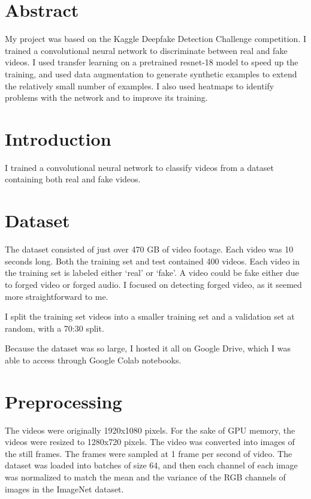 \documentclass[12pt,letterpaper]{hmcpset}
\begin{document}

\section{Abstract}
My project was based on the Kaggle Deepfake Detection Challenge competition. 
I trained a convolutional neural network to discriminate between real and fake videos.
I used transfer learning on a pretrained resnet-18 model to speed up the training, and used data augmentation to generate synthetic examples to extend the relatively small number of examples.
I also used heatmaps to identify problems with the network and to improve its training.

\section{Introduction}
I trained a convolutional neural network to classify videos from a dataset containing both real and fake videos. 

\section{Dataset}
The dataset consisted of just over 470 GB of video footage.
Each video was 10 seconds long.
Both the training set and test contained 400 videos.
Each video in the training set is labeled either `real' or `fake'.
A video could be fake either due to forged video or forged audio.
I focused on detecting forged video, as it seemed more straightforward to me.

I split the training set videos into a smaller training set and a validation set at random, with a 70:30 split.

Because the dataset was so large, I hosted it all on Google Drive, which I was able to access through Google Colab notebooks.

\section{Preprocessing}
The videos were originally 1920x1080 pixels.
For the sake of GPU memory, the videos were resized to 1280x720 pixels.
The video was converted into images of the still frames.
The frames were sampled at 1 frame per second of video.
The dataset was loaded into batches of size 64, and then each channel of each image was normalized to match the mean and the variance of the RGB channels of images in the ImageNet dataset.
\end{document}
